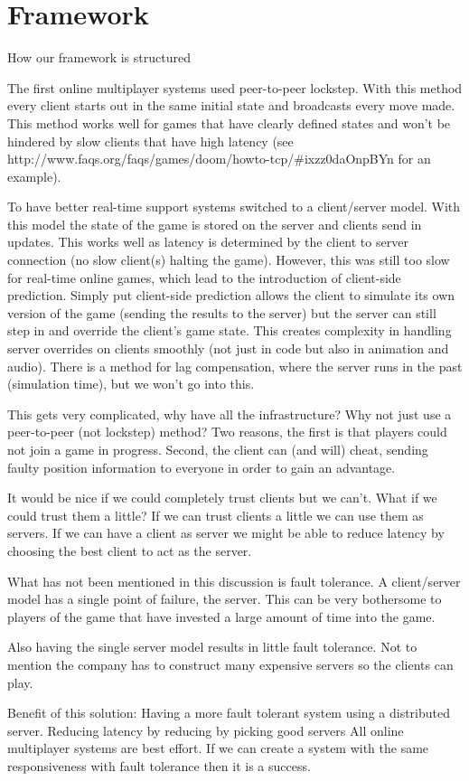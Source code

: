 
\section{Framework}
\label{sec:framework}

How our framework is structured

The first online multiplayer systems used peer-to-peer lockstep. With this method every client starts out in the same initial state and broadcasts every move made. This method works well for games that have clearly defined states and won’t be hindered by slow clients that have high latency (see http://www.faqs.org/faqs/games/doom/howto-tcp/#ixzz0daOnpBYn for an example). 

To have better real-time support systems switched to a client/server model. With this model the state of the game is stored on the server and clients send in updates. This works well as latency is determined by the client to server connection (no slow client(s) halting the game). However, this was still too slow for real-time online games, which lead to the introduction of client-side prediction. Simply put client-side prediction allows the client to simulate its own version of the game (sending the results to the server) but the server can still step in and override the client's game state. This creates complexity in handling server overrides on clients smoothly (not just in code but also in animation and audio). There is a method for lag compensation, where the server runs in the past (simulation time), but we won’t go into this.

This gets very complicated, why have all the infrastructure? Why not just use a peer-to-peer (not lockstep) method? Two reasons, the first is that players could not join a game in progress. Second, the client can (and will) cheat, sending faulty position information to everyone in order to gain an advantage.

It would be nice if we could completely trust clients but we can’t. What if we could trust them a little? If we can trust clients a little we can use them as servers. If we can have a client as server we might be able to reduce latency by choosing the best client to act as the server.

What has not been mentioned in this discussion is fault tolerance. A client/server model has a single point of failure, the server. This can be very bothersome to players of the game that have invested a large amount of time into the game. 

Also having the single server model results in little fault tolerance. Not to mention the company has to construct many expensive servers so the clients can play.

Benefit of this solution:
Having a more fault tolerant system using a distributed server. 
Reducing latency by reducing by picking good servers
All online multiplayer systems are best effort. If we can create a system with the same responsiveness with fault tolerance then it is a success.